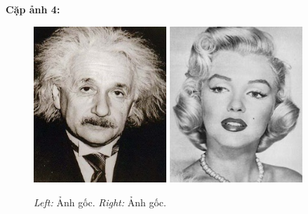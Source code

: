 \textbf{Cặp ảnh 4:}
\begin{figure}[H]
    \centering
    \includegraphics[width=5cm]{images/results_part2/marilyn_einstein/04_einstein.jpg}
    \includegraphics[width=5cm]{images/results_part2/marilyn_einstein/04_marilyn.jpg}
    \caption{\emph{Left:} Ảnh gốc. \emph{Right:} Ảnh gốc.}
\end{figure}

